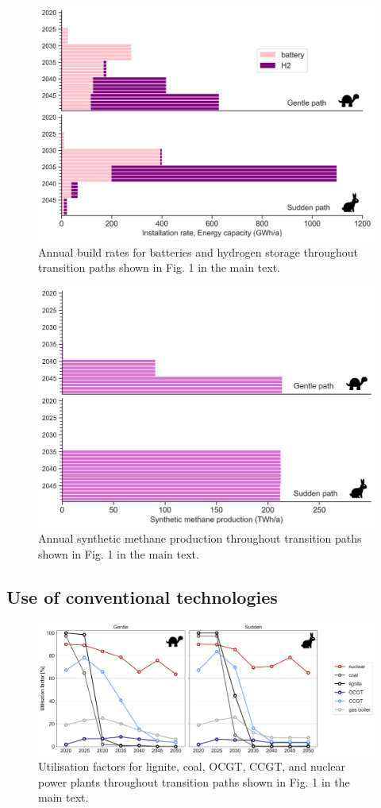 \documentclass[3p]{elsarticle} %
\begin{document}
\begin{figure}[!h]
\centering
\includegraphics[width=0.7\columnwidth]{../figures/storage_expansion_Base.png}
\caption{Annual build rates for batteries and hydrogen storage throughout transition paths shown in Fig. 1 in the main text.} \label{fig_battery_hydrogen} 
\end{figure}

\begin{figure}[!h]
\centering
\includegraphics[width=0.7\columnwidth]{../figures/methanation_expansion_Base.png}
\caption{Annual synthetic methane production throughout transition paths shown in Fig. 1 in the main text.} \label{fig_synthetic_methane} 
\end{figure}

\FloatBarrier

\subsection{Use of conventional technologies}

\begin{figure}[!h]
\centering
\includegraphics[width=\columnwidth]{../figures/utilisation_factors_Base.png}
\caption{Utilisation factors for lignite, coal, OCGT, CCGT, and nuclear power plants throughout transition paths shown in Fig. 1 in the main text.} \label{fig_utilisation_factors} 
\end{figure}
\end{document}
